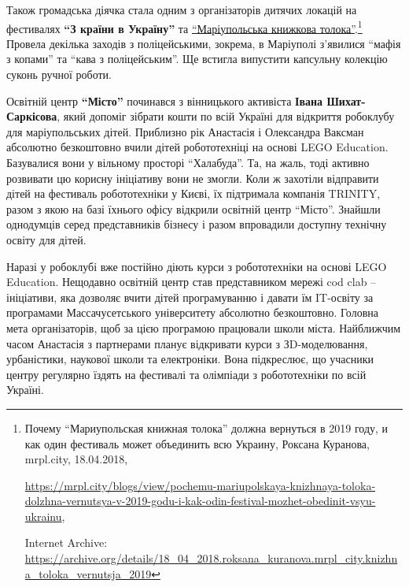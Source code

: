 Також громадська діячка стала одним з організаторів дитячих локацій на
фестивалях \textbf{\enquote{З країни в Україну}} та \href{https://archive.org/details/18_04_2018.roksana_kuranova.mrpl_city.knizhna_toloka_vernutsja_2019}{\enquote{Маріупольська книжкова толока}}.\footnote{%
Почему \enquote{Мариупольская книжная толока} должна вернуться в 2019 году, и как один фестиваль может объединить всю Украину, %
Роксана Куранова, mrpl.city, 18.04.2018, \par%
\url{https://mrpl.city/blogs/view/pochemu-mariupolskaya-knizhnaya-toloka-dolzhna-vernutsya-v-2019-godu-i-kak-odin-festival-mozhet-obedinit-vsyu-ukrainu}, \par%
Internet Archive: \url{https://archive.org/details/18_04_2018.roksana_kuranova.mrpl_city.knizhna_toloka_vernutsja_2019}
} Провела
декілька заходів з поліцейськими, зокрема, в Маріуполі з'явилися \enquote{мафія з
копами} та \enquote{кава з поліцейським}. Ще встигла випустити капсульну колекцію
суконь ручної роботи.


Освітній центр \textbf{\enquote{Місто}} починався з вінницького активіста \textbf{Івана Шихат-Саркісова},
який допоміг зібрати кошти по всій Україні для відкриття робоклубу для
маріупольських дітей. Приблизно рік Анастасія і Олександра Ваксман абсолютно
безкоштовно вчили дітей робототехніці на основі LEGO Education. Базувалися вони
у вільному просторі \enquote{Халабуда}. Та, на жаль, тоді активно розвивати цю корисну
ініціативу вони не змогли. Коли ж захотіли відправити дітей на фестиваль
робототехніки у Києві, їх підтримала компанія TRINITY, разом з якою на базі
їхнього офісу відкрили освітній центр \enquote{Місто}. Знайшли однодумців серед
представників бізнесу і разом впровадили доступну технічну освіту для дітей.


Наразі у робоклубі вже постійно діють курси з робототехніки на основі LEGO
Education. Нещодавно освітній центр став представником мережі cod clab –
ініціативи, яка дозволяє вчити дітей програмуванню і давати їм IT-освіту за
програмами Массачусетського університету абсолютно безкоштовно. Головна мета
організаторів, щоб за цією програмою працювали школи міста. Найближчим часом
Анастасія з партнерами планує відкривати курси з ЗD-моделювання, урбаністики,
наукової школи та електроніки. Вона підкреслює, що учасники центру регулярно
їздять на фестивалі та олімпіади з робототехніки по всій Україні.


